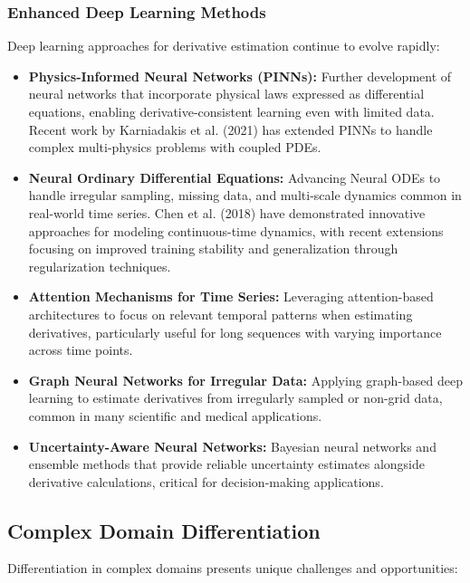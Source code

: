 \documentclass{article}
\begin{document}
\subsubsection{Enhanced Deep Learning Methods}

Deep learning approaches for derivative estimation continue to evolve rapidly:

\begin{itemize}
    \item \textbf{Physics-Informed Neural Networks (PINNs):} Further development of neural networks that incorporate physical laws expressed as differential equations, enabling derivative-consistent learning even with limited data. Recent work by Karniadakis et al. (2021) has extended PINNs to handle complex multi-physics problems with coupled PDEs.
    
    \item \textbf{Neural Ordinary Differential Equations:} Advancing Neural ODEs to handle irregular sampling, missing data, and multi-scale dynamics common in real-world time series. Chen et al. (2018) have demonstrated innovative approaches for modeling continuous-time dynamics, with recent extensions focusing on improved training stability and generalization through regularization techniques.
    
    \item \textbf{Attention Mechanisms for Time Series:} Leveraging attention-based architectures to focus on relevant temporal patterns when estimating derivatives, particularly useful for long sequences with varying importance across time points.
    
    \item \textbf{Graph Neural Networks for Irregular Data:} Applying graph-based deep learning to estimate derivatives from irregularly sampled or non-grid data, common in many scientific and medical applications.
    
    \item \textbf{Uncertainty-Aware Neural Networks:} Bayesian neural networks and ensemble methods that provide reliable uncertainty estimates alongside derivative calculations, critical for decision-making applications.
\end{itemize}

\subsection{Complex Domain Differentiation}

Differentiation in complex domains presents unique challenges and opportunities:
\end{document}
